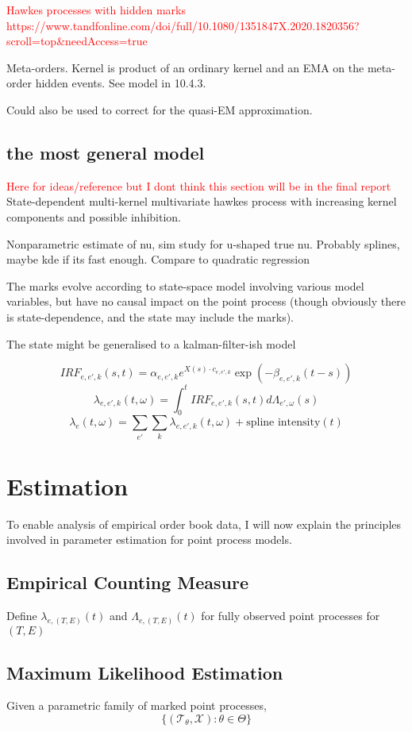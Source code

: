 \documentclass[honours,12pt]{unswthesis}
\numberwithin{equation}{section}
\begin{document}
\textcolor{red}{Hawkes processes with hidden marks https://www.tandfonline.com/doi/full/10.1080/1351847X.2020.1820356?scroll=top&needAccess=true}

Meta-orders. Kernel is product of an ordinary kernel and an EMA on the meta-order hidden events. See model in \cite{BouchaudEtAl} 10.4.3.

Could also be used to correct for the quasi-EM approximation.

\section{the most general model}
\textcolor{red}{Here for ideas/reference but I dont think this section will be in the final report}
State-dependent multi-kernel multivariate hawkes process with increasing kernel components and possible inhibition.

Nonparametric estimate of nu, sim study for u-shaped true nu. Probably splines, maybe kde if its fast enough. Compare to quadratic regression

The marks evolve according to state-space model involving various model variables, but have no causal impact on the point process (though obviously there is state-dependence, and the state may include the marks).

The state might be generalised to a kalman-filter-ish model \cite{SmithBrown}

$$IRF_{e,e',k}(s,t) = \alpha_{e,e',k} e^{X(s)\cdot c_{e,e',k}}\exp\left(-\beta_{e,e',k}(t-s)\right)$$
$$\lambda_{e,e',k}(t,\omega) = \int_0^t IRF_{e,e',k}(s,t) d\Lambda_{e',\omega}(s)$$
$$\lambda_e(t,\omega) = \sum_{e'} \sum_k \lambda_{e,e',k}(t,\omega) + \text{spline intensity}(t)$$


\chapter{Estimation}%

To enable analysis of empirical order book data, I will now explain the principles involved in parameter estimation for point process models.

\section{Empirical Counting Measure}
Define $\lambda_{e,(T,E)}(t)$ and $\Lambda_{e,(T,E)}(t)$ for fully observed point processes for $(T,E)$

\section{Maximum Likelihood Estimation}
Given a parametric family of marked point processes,
$$\{(\mathcal{T}_\theta,\mathcal{X}) : \theta\in\Theta\}$$
\end{document}
